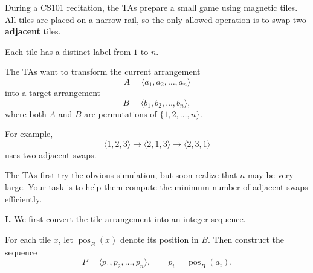 

During a CS101 recitation, the TAs prepare a small game using magnetic
tiles. All tiles are placed on a narrow rail, so the only allowed
operation is to swap two \textbf{adjacent} tiles.

Each tile has a distinct label from $1$ to $n$.

The TAs want to transform the current arrangement
\[
A=\langle a_1,a_2,\ldots,a_n\rangle
\]
into a target arrangement
\[
B=\langle b_1,b_2,\ldots,b_n\rangle,
\]
where both $A$ and $B$ are permutations of $\{1,2,\ldots,n\}$.

For example,
\[
\langle1,2,3\rangle
\rightarrow
\langle2,1,3\rangle
\rightarrow
\langle2,3,1\rangle
\]
uses two adjacent swaps.

The TAs first try the obvious simulation, but soon realize that $n$ may be
very large. Your task is to help them compute the minimum number of adjacent
swaps efficiently.

{

\setlength{\leftskip}{-2em}
\textbf{I.} We first convert the tile arrangement into an integer sequence.

For each tile $x$, let $\operatorname{pos}_B(x)$ denote its position in $B$.
Then construct the sequence
\[
P=\langle p_1,p_2,\ldots,p_n\rangle,
\qquad
p_i=\operatorname{pos}_B(a_i).
\]

}

